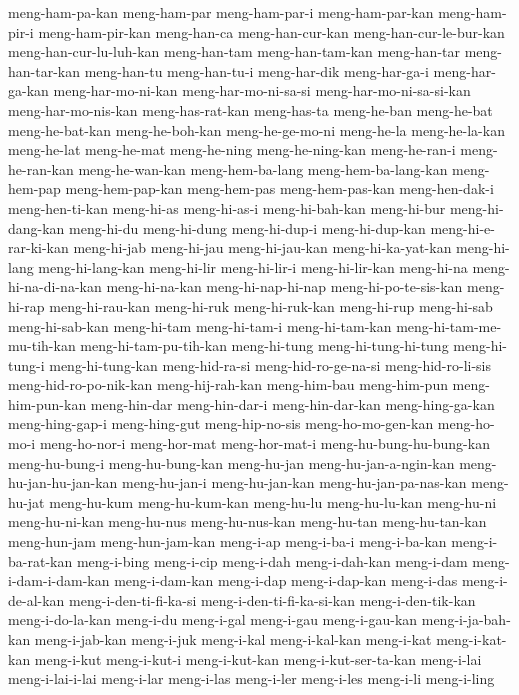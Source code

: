 {meng-ham-pa-kan meng-ham-par meng-ham-par-i meng-ham-par-kan
meng-ham-pir-i meng-ham-pir-kan meng-han-ca meng-han-cur-kan
meng-han-cur-le-bur-kan meng-han-cur-lu-luh-kan meng-han-tam
meng-han-tam-kan meng-han-tar meng-han-tar-kan meng-han-tu meng-han-tu-i
meng-har-dik meng-har-ga-i meng-har-ga-kan meng-har-mo-ni-kan
meng-har-mo-ni-sa-si meng-har-mo-ni-sa-si-kan meng-har-mo-nis-kan
meng-has-rat-kan meng-has-ta meng-he-ban meng-he-bat meng-he-bat-kan
meng-he-boh-kan meng-he-ge-mo-ni meng-he-la meng-he-la-kan meng-he-lat
meng-he-mat meng-he-ning meng-he-ning-kan meng-he-ran-i meng-he-ran-kan
meng-he-wan-kan meng-hem-ba-lang meng-hem-ba-lang-kan meng-hem-pap
meng-hem-pap-kan meng-hem-pas meng-hem-pas-kan meng-hen-dak-i
meng-hen-ti-kan meng-hi-as meng-hi-as-i meng-hi-bah-kan meng-hi-bur
meng-hi-dang-kan meng-hi-du meng-hi-dung meng-hi-dup-i meng-hi-dup-kan
meng-hi-e-rar-ki-kan meng-hi-jab meng-hi-jau meng-hi-jau-kan
meng-hi-ka-yat-kan meng-hi-lang meng-hi-lang-kan meng-hi-lir meng-hi-lir-i
meng-hi-lir-kan meng-hi-na meng-hi-na-di-na-kan meng-hi-na-kan
meng-hi-nap-hi-nap meng-hi-po-te-sis-kan meng-hi-rap meng-hi-rau-kan
meng-hi-ruk meng-hi-ruk-kan meng-hi-rup meng-hi-sab meng-hi-sab-kan
meng-hi-tam meng-hi-tam-i meng-hi-tam-kan meng-hi-tam-me-mu-tih-kan
meng-hi-tam-pu-tih-kan meng-hi-tung meng-hi-tung-hi-tung meng-hi-tung-i
meng-hi-tung-kan meng-hid-ra-si meng-hid-ro-ge-na-si meng-hid-ro-li-sis
meng-hid-ro-po-nik-kan meng-hij-rah-kan meng-him-bau meng-him-pun
meng-him-pun-kan meng-hin-dar meng-hin-dar-i meng-hin-dar-kan
meng-hing-ga-kan meng-hing-gap-i meng-hing-gut meng-hip-no-sis
meng-ho-mo-gen-kan meng-ho-mo-i meng-ho-nor-i meng-hor-mat meng-hor-mat-i
meng-hu-bung-hu-bung-kan meng-hu-bung-i meng-hu-bung-kan meng-hu-jan
meng-hu-jan-a-ngin-kan meng-hu-jan-hu-jan-kan meng-hu-jan-i
meng-hu-jan-kan meng-hu-jan-pa-nas-kan meng-hu-jat meng-hu-kum
meng-hu-kum-kan meng-hu-lu meng-hu-lu-kan meng-hu-ni meng-hu-ni-kan
meng-hu-nus meng-hu-nus-kan meng-hu-tan meng-hu-tan-kan meng-hun-jam
meng-hun-jam-kan meng-i-ap meng-i-ba-i meng-i-ba-kan meng-i-ba-rat-kan
meng-i-bing meng-i-cip meng-i-dah meng-i-dah-kan meng-i-dam
meng-i-dam-i-dam-kan meng-i-dam-kan meng-i-dap meng-i-dap-kan meng-i-das
meng-i-de-al-kan meng-i-den-ti-fi-ka-si meng-i-den-ti-fi-ka-si-kan
meng-i-den-tik-kan meng-i-do-la-kan meng-i-du meng-i-gal meng-i-gau
meng-i-gau-kan meng-i-ja-bah-kan meng-i-jab-kan meng-i-juk meng-i-kal
meng-i-kal-kan meng-i-kat meng-i-kat-kan meng-i-kut meng-i-kut-i
meng-i-kut-kan meng-i-kut-ser-ta-kan meng-i-lai meng-i-lai-i-lai
meng-i-lar meng-i-las meng-i-ler meng-i-les meng-i-li meng-i-ling
}
